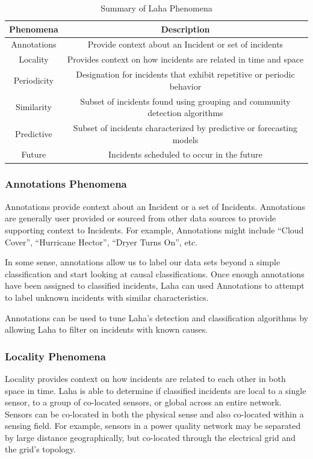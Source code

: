 \begin{table}
	\centering
	\caption{Summary of Laha Phenomena}
	\begin{tabular}{|c|c|}
		\hline
		Phenomena & Description \\
		\hline
		Annotations & Provide context about an Incident or set of incidents \\
		\hline
		Locality & Provides context on how incidents are related in time and space \\
		\hline
		Periodicity & Designation for incidents that exhibit repetitive or periodic behavior \\ 
		\hline
		Similarity & Subset of incidents found using grouping and community detection algorithms \\
		\hline
		Predictive & Subset of incidents characterized by predictive or forecasting models\\
		\hline
		Future & Incidents scheduled to occur in the future\\
		\hline
	\end{tabular}
	\label{phenomena-summary-table}
\end{table}

\subsubsection{Annotations Phenomena} \label{annotations-phenomena}
Annotations provide context about an Incident or a set of Incidents. Annotations are generally user provided or sourced from other data sources to provide supporting context to Incidents. For example, Annotations might include “Cloud Cover”, “Hurricane Hector”, “Dryer Turns On”, etc.

In some sense, annotations allow us to label our data sets beyond a simple classification and start looking at causal classifications. Once enough annotations have been assigned to classified incidents, Laha can used Annotations to attempt to label unknown incidents with similar characteristics.

Annotations can be used to tune Laha's detection and classification algorithms by allowing Laha to filter on incidents with known causes.

\subsubsection{Locality Phenomena} \label{locality-phenomena}
Locality provides context on how incidents are related to each other in both space in time. Laha is able to determine if classified incidents are local to a single sensor, to a group of co-located sensors, or global across an entire network. Sensors can be co-located in both the physical sense and also co-located within a sensing field. For example, sensors in a power quality network may be separated by large distance geographically, but co-located through the electrical grid and the grid's topology. 

